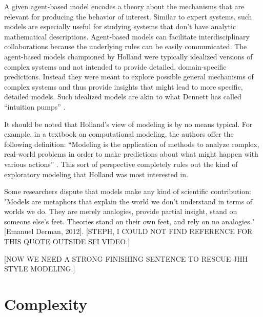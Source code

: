\documentclass{sig-alternate}
\begin{document}
A given agent-based model encodes a theory about the mechanisms that
are relevant for producing the behavior of interest.  Similar to
expert systems, such models are especially useful for studying systems
that don't have analytic mathematical descriptions.  Agent-based
models can facilitate interdisciplinary collaborations because the
underlying rules can be easily communicated.  The agent-based models
championed by Holland were typically idealized versions of complex
systems and not intended to provide detailed, domain-specific
predictions.  Instead they were meant to explore possible general
mechanisms of complex systems and thus provide insights that might
lead to more specific, detailed models.  Such idealized models are
akin to what Dennett has called ``intuition pumps''
\cite{Dennett1984}.

It should be noted that Holland's view of modeling is by no means
typical.  For example, in a textbook on computational modeling, the
authors offer the following definition: “Modeling is the application
of methods to analyze complex, real-world problems in order to make
predictions about what might happen with various actions”
\cite{Shiflet2014}.   This sort of perspective completely rules out the
kind of exploratory modeling that Holland was most interested in. 

Some researchers dispute that models make any kind of scientific
contribution: "Models are metaphors that explain the world we don't
understand in terms of worlds we do.  They are merely analogies,
provide partial insight, stand on someone else's feet.  Theories stand
on their own feet, and rely on no analogies."  [Emanuel Derman, 2012].
[STEPH, I COULD NOT FIND REFERENCE FOR THIS QUOTE OUTSIDE SFI VIDEO.]

[NOW WE NEED A STRONG FINISHING SENTENCE TO RESCUE JHH STYLE
  MODELING.]

\section{Complexity}

\end{document}
